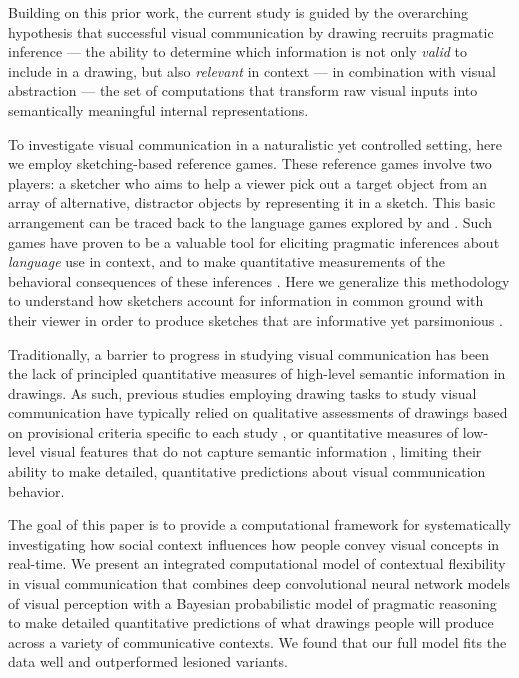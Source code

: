 \documentclass[9pt,twocolumn,twoside]{pnas-new}
\begin{document}
Building on this prior work, the current study is guided by the overarching hypothesis that successful visual communication by drawing recruits pragmatic inference \cite{goodman2016pragmatic,clark1996using,wilson1986relevance,grice1975syntax} --- the ability to determine which information is not only \textit{valid} to include in a drawing, but also \textit{relevant} in context --- in combination with visual abstraction --- the set of computations that transform raw visual inputs into semantically meaningful internal representations.

To investigate visual communication in a naturalistic yet controlled setting, here we employ sketching-based reference games. 
These reference games involve two players: a sketcher who aims to help a viewer pick out a target object from an array of alternative, distractor objects by representing it in a sketch. 
This basic arrangement can be traced back to the language games explored by \citep{wittgenstein1953philosophical} and \citep{Lewis69_Convention}. 
Such games have proven to be a valuable tool for eliciting pragmatic inferences about \textit{language} use in context, and to make quantitative measurements of the behavioral consequences of these inferences \cite{goodman2016pragmatic,kao2014formalizing,goodman2013knowledge,frank2012predicting}. 
Here we generalize this methodology to understand how sketchers account for information in common ground with their viewer in order to produce sketches that are informative \cite{grice1975syntax,wilson1986relevance} yet parsimonious \cite{zipf1936psycho}.

Traditionally, a barrier to progress in studying visual communication has been the lack of principled quantitative measures of high-level semantic information in drawings. 
As such, previous studies employing drawing tasks to study visual communication have typically relied on qualitative assessments of drawings based on provisional criteria specific to each study \cite{Healey:2007vq}, or quantitative measures of low-level visual features that do not capture semantic information \cite{Garrod:2007wk}, limiting their ability to make detailed, quantitative predictions about visual communication behavior.

The goal of this paper is to provide a computational framework for systematically investigating how social context influences how people convey visual concepts in real-time. 
We present an integrated computational model of contextual flexibility in visual communication that combines deep convolutional neural network models of visual perception with a Bayesian probabilistic model of pragmatic reasoning \cite{goodman2016pragmatic} to make detailed quantitative predictions of what drawings people will produce across a variety of communicative contexts. 
We found that our full model fits the data well and outperformed lesioned variants.
\end{document}

